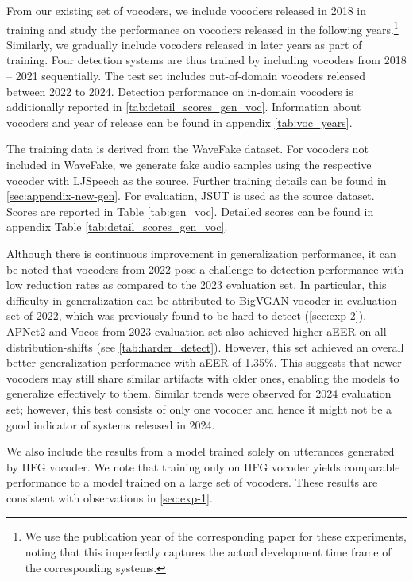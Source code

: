 From our existing set of vocoders, we include vocoders released in 2018 in training and study the performance on vocoders released in the following years.\footnote{We use the publication year of the corresponding paper for these experiments, noting that this imperfectly captures the actual development time frame of the corresponding systems.} Similarly, we gradually include vocoders released in later years as part of training. Four detection systems are thus trained by including vocoders from 2018 -- 2021 sequentially. The test set includes out-of-domain vocoders released between 2022 to 2024. Detection performance on in-domain vocoders is additionally reported in \autoref{tab:detail_scores_gen_voc}.  Information about vocoders and year of release can be found in appendix \autoref{tab:voc_years}.

The training data is derived from the WaveFake dataset. For vocoders not included in WaveFake, we generate fake audio samples using the respective vocoder with LJSpeech as the source. Further training details can be found in \autoref{sec:appendix-new-gen}. For evaluation, JSUT is used as the source dataset. Scores are reported in Table \ref{tab:gen_voc}. Detailed scores can be found in appendix Table \ref{tab:detail_scores_gen_voc}. 

Although there is continuous improvement in generalization performance, it can be noted that vocoders from 2022 pose a challenge to detection performance with low reduction rates as compared to the 2023 evaluation set. In particular, this difficulty in generalization can be attributed to BigVGAN vocoder in evaluation set of 2022, which was previously found to be hard to detect (\autoref{sec:exp-2}).
APNet2 and Vocos from 2023 evaluation set also achieved higher aEER on all distribution-shifts (see \autoref{tab:harder_detect}). However, this set achieved an overall better generalization performance with aEER of 1.35\%. This suggests that newer vocoders may still share similar artifacts with older ones, enabling the models to generalize effectively to them. Similar trends were observed for 2024 evaluation set; however, this test consists of only one vocoder and hence it might not be a good indicator of systems released in 2024. 

We also include the results from a model trained solely on utterances generated by HFG vocoder. We note that training only on HFG vocoder yields comparable performance to a model trained on a large set of vocoders. These results are consistent with observations in \autoref{sec:exp-1}.
